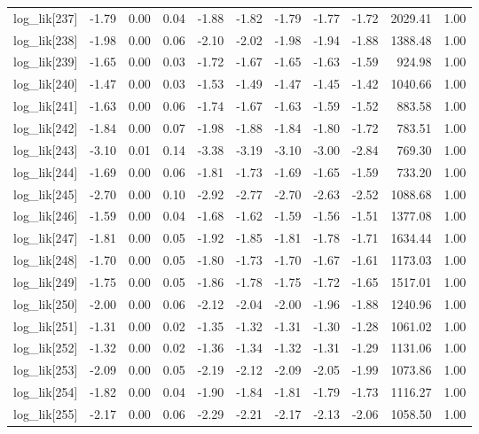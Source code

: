 \begin{table}[ht]
\begin{tabular}{rrrrrrrrrrr}
  log\_lik[237] & -1.79 & 0.00 & 0.04 & -1.88 & -1.82 & -1.79 & -1.77 & -1.72 & 2029.41 & 1.00 \\ 
  log\_lik[238] & -1.98 & 0.00 & 0.06 & -2.10 & -2.02 & -1.98 & -1.94 & -1.88 & 1388.48 & 1.00 \\ 
  log\_lik[239] & -1.65 & 0.00 & 0.03 & -1.72 & -1.67 & -1.65 & -1.63 & -1.59 & 924.98 & 1.00 \\ 
  log\_lik[240] & -1.47 & 0.00 & 0.03 & -1.53 & -1.49 & -1.47 & -1.45 & -1.42 & 1040.66 & 1.00 \\ 
  log\_lik[241] & -1.63 & 0.00 & 0.06 & -1.74 & -1.67 & -1.63 & -1.59 & -1.52 & 883.58 & 1.00 \\ 
  log\_lik[242] & -1.84 & 0.00 & 0.07 & -1.98 & -1.88 & -1.84 & -1.80 & -1.72 & 783.51 & 1.00 \\ 
  log\_lik[243] & -3.10 & 0.01 & 0.14 & -3.38 & -3.19 & -3.10 & -3.00 & -2.84 & 769.30 & 1.00 \\ 
  log\_lik[244] & -1.69 & 0.00 & 0.06 & -1.81 & -1.73 & -1.69 & -1.65 & -1.59 & 733.20 & 1.00 \\ 
  log\_lik[245] & -2.70 & 0.00 & 0.10 & -2.92 & -2.77 & -2.70 & -2.63 & -2.52 & 1088.68 & 1.00 \\ 
  log\_lik[246] & -1.59 & 0.00 & 0.04 & -1.68 & -1.62 & -1.59 & -1.56 & -1.51 & 1377.08 & 1.00 \\ 
  log\_lik[247] & -1.81 & 0.00 & 0.05 & -1.92 & -1.85 & -1.81 & -1.78 & -1.71 & 1634.44 & 1.00 \\ 
  log\_lik[248] & -1.70 & 0.00 & 0.05 & -1.80 & -1.73 & -1.70 & -1.67 & -1.61 & 1173.03 & 1.00 \\ 
  log\_lik[249] & -1.75 & 0.00 & 0.05 & -1.86 & -1.78 & -1.75 & -1.72 & -1.65 & 1517.01 & 1.00 \\ 
  log\_lik[250] & -2.00 & 0.00 & 0.06 & -2.12 & -2.04 & -2.00 & -1.96 & -1.88 & 1240.96 & 1.00 \\ 
  log\_lik[251] & -1.31 & 0.00 & 0.02 & -1.35 & -1.32 & -1.31 & -1.30 & -1.28 & 1061.02 & 1.00 \\ 
  log\_lik[252] & -1.32 & 0.00 & 0.02 & -1.36 & -1.34 & -1.32 & -1.31 & -1.29 & 1131.06 & 1.00 \\ 
  log\_lik[253] & -2.09 & 0.00 & 0.05 & -2.19 & -2.12 & -2.09 & -2.05 & -1.99 & 1073.86 & 1.00 \\ 
  log\_lik[254] & -1.82 & 0.00 & 0.04 & -1.90 & -1.84 & -1.81 & -1.79 & -1.73 & 1116.27 & 1.00 \\ 
  log\_lik[255] & -2.17 & 0.00 & 0.06 & -2.29 & -2.21 & -2.17 & -2.13 & -2.06 & 1058.50 & 1.00 \\ 

\end{tabular}
\end{table}
